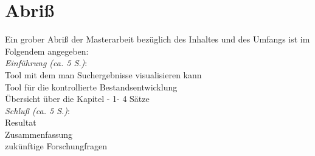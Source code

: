 \documentclass[10pt,a4paper,twocolumn,conference]{IEEEtran}
\begin{document}
\section{Abriß}
Ein grober Abriß der Masterarbeit bezüglich des Inhaltes und des Umfangs ist im
Folgendem angegeben:\\
\textit{Einführung (ca. 5 S.)}:\\Tool mit dem man Suchergebnisse visualisieren kann\\
Tool für die kontrollierte Bestandsentwicklung\\Übersicht über die Kapitel - 1-
4 Sätze\\
\textit{Schluß (ca. 5 S.)}:\\
Resultat\\
Zusammenfassung\\
zukünftige Forschungfragen
            

 
\end{document}
